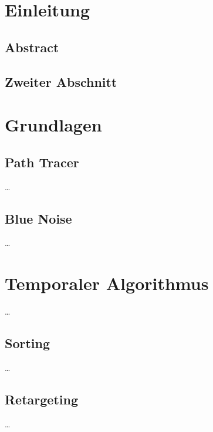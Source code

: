 
\chapter{Einleitung}
\label{ch:Introduction}

\section{Abstract}

\section{Zweiter Abschnitt}


\chapter{Grundlagen}
\label{ch:Grundlagen}


\section{Path Tracer}
\label{ch:Content1:sec:Path Tracer}

\dots


\section{Blue Noise}
\label{ch:Content1:sec:BlueNoise}

\dots



\chapter{Temporaler Algorithmus}
\label{ch:Content2}

\dots


\section{Sorting}
\label{ch:Content2:sec:Sorting}

\dots


\section{Retargeting}
\label{ch:Content2:sec:Retargeting}

\dots

